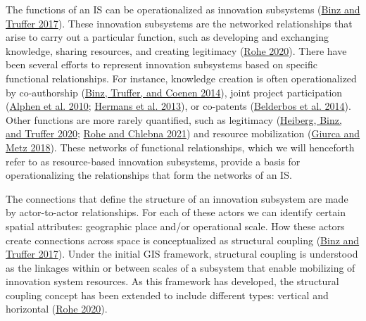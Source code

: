 \documentclass[twoside,12pt,final]{ucthesis-CA2012}
\begin{document}
\begin{ucmainmatter}
The functions of an IS can be operationalized as innovation subsystems
(\protect\hyperlink{ref-Binz_Truffer_2017}{Binz and Truffer 2017}). These
innovation subsystems are the networked relationships that arise to
carry out a particular function, such as developing and exchanging
knowledge, sharing resources, and creating legitimacy
(\protect\hyperlink{ref-Rohe_2020}{Rohe 2020}). There have been
several efforts to represent innovation subsystems based on specific
functional relationships. For instance, knowledge creation is often
operationalized by co-authorship
(\protect\hyperlink{ref-Binz_Truffer_Coenen_2014}{Binz, Truffer, and Coenen 2014}),
joint project participation (\protect\hyperlink{ref-van_Alphen_Noothout_Hekkert_Turkenburg_2010}{Alphen et al. 2010}; \protect\hyperlink{ref-Hermans_Stuiver_Beers_Kok_2013}{Hermans et al. 2013}),
or co-patents (\protect\hyperlink{ref-Belderbos_Cassiman_Faems_Leten_Van_Looy_2014}{Belderbos et al. 2014}). Other functions
are more rarely quantified, such as legitimacy
(\protect\hyperlink{ref-Heiberg_Binz_Truffer_2020}{Heiberg, Binz, and Truffer 2020}; \protect\hyperlink{ref-Rohe_Chlebna_2021}{Rohe and Chlebna 2021})
and resource mobilization
(\protect\hyperlink{ref-Giurca_Metz_2018}{Giurca and Metz 2018}). These
networks of functional relationships, which we will henceforth refer to
as \textquotesingle resource-based innovation subsystems\textquotesingle, provide a basis for
operationalizing the relationships that form the networks of an IS.

The connections that define the structure of an innovation subsystem are
made by actor-to-actor relationships. For each of these actors we can
identify certain spatial attributes: geographic place and/or operational
scale. How these actors create connections across space is
conceptualized as \textquotesingle structural coupling\textquotesingle{}
(\protect\hyperlink{ref-Binz_Truffer_2017}{Binz and Truffer 2017}). Under
the initial GIS framework, structural coupling is understood as the
linkages within or between scales of a subsystem that enable mobilizing
of innovation system resources. As this framework has developed, the
structural coupling concept has been extended to include different
types: vertical and horizontal
(\protect\hyperlink{ref-Rohe_2020}{Rohe 2020}).


\end{ucmainmatter}
\end{document}
